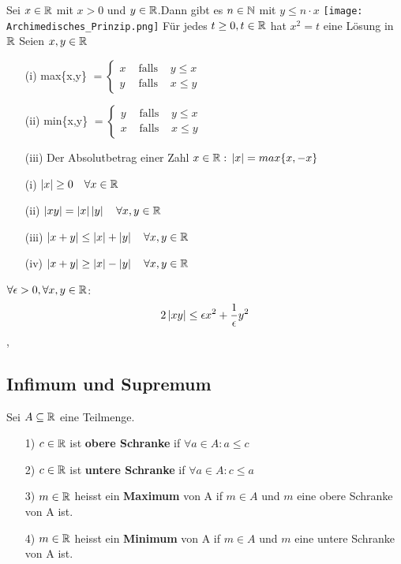  \newline
Sei \(x \in \mathbb{R}\) mit \(x > 0\) und \(y \in \mathbb{R}\).Dann gibt es \(n \in \mathbb{N}\) mit \(y \leq n \cdot x\) \newline \newline \newline
\texttt{[image: Archimedisches\_Prinzip.png]}
\Satz[1.8] \newline
Für jedes \(t \geq 0, t \in \mathbb{R}\) hat \(x^2 = t\) eine Lösung in \(\mathbb{R}\) \newline
\Def[1.9] Seien \(x,y \in \mathbb{R} \) \newline
\begin{enumerate}
    \item [(i)] max\{x,y\} \(= \left\{\begin{array}{lll}
        x & \text { falls } & y \leq x \\
        y & \text { falls } & x \leq y
        \end{array}\right.\)
    \item[(ii)] min\{x,y\}  \(= \left\{\begin{array}{lll}
        y & \text { falls } & y \leq x \\
        x & \text { falls } & x \leq y
        \end{array}\right.\)
    \item[(iii)]  Der Absolutbetrag einer Zahl \(x \in \R: \newline \abs{x} = max\{x, -x\}\)
\end{enumerate}
\Satz[1.10]
\begin{enumerate}
    \item [(i)] \( \left\lvert x \right\rvert \geq 0 \quad \forall x \in \mathbb{R} \)
    \item [(ii)] \(\left\lvert xy \right\rvert = \left\lvert x \right\rvert\left\lvert y \right\rvert \quad \forall x,y \in \mathbb{R} \)
    \item [(iii)] \(\left\lvert x+ y \right\rvert \leq \left\lvert x \right\rvert + \left\lvert y \right\rvert \quad \forall x,y \in \mathbb{R}\)
    \item [(iv)] \( \left\lvert x + y \right\rvert \geq \left\lvert x \right\rvert - \left\lvert y \right\rvert \quad \forall x,y \in \mathbb{R}\)
\end{enumerate}
 \newline
\(\forall \epsilon > 0, \forall x,y \in \mathbb{R} \):
\[2 \left\lvert xy \right\rvert \leq \epsilon x^2 + \frac{1}{\epsilon}y^2\]
\sep
\subsection{Infimum und Supremum}
\Def[1.12]  Sei \(A \subseteq \mathbb{R}\) eine Teilmenge.
\begin{enumerate}
\item[1)]  \(c \in \mathbb{R}\) ist \textbf{obere Schranke} if  \(\forall a \in A: a \leq c\)
\item[2)]  \(c \in \mathbb{R}\) ist \textbf{untere Schranke} if \(\forall a \in A: c \leq a\)
\item[3)] \(m \in \mathbb{R}\) heisst ein \textbf{Maximum} von A if \(m \in A\) und \(m\) eine obere Schranke von A ist.
\item[4)] \(m \in \mathbb{R}\) heisst ein \textbf{Minimum} von A if \(m \in A\) und \(m\) eine untere Schranke von A ist.
\end{enumerate}

